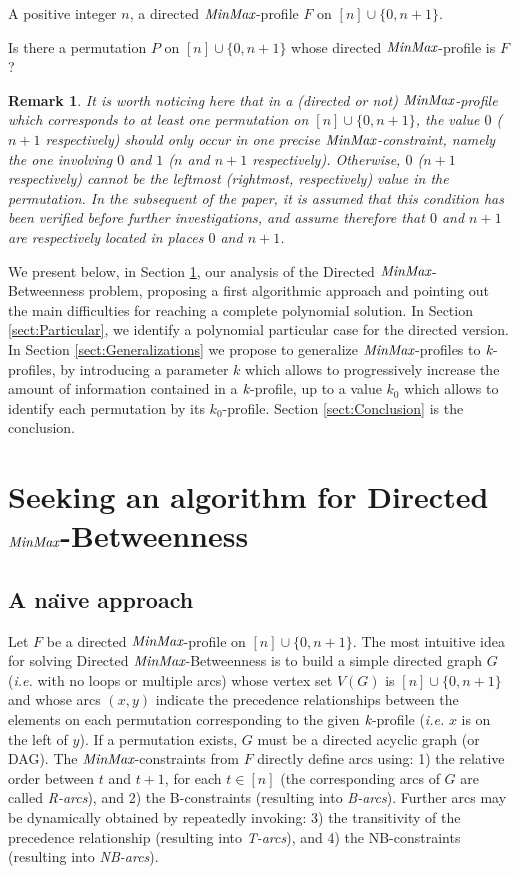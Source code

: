 \documentclass{article}
\newcommand{\M}{\mbox{\it MinMax}}
\newcommand{\kM}{\mbox{\it k}}
\newcommand{\n}{[n]}
\newtheorem{rmk}{Remark}
\newcommand{\br}{\begin{rmk}\rm}
\newcommand{\er}{\end{rmk}}
\begin{document}
\noindent{\sc Directed $\M$-Betweenness}

 A positive integer $n$, a directed $\M$-profile $F$ on $\n\cup\{0, n+1\}$.

 Is there a permutation $P$ on $\n\cup\{0,n+1\}$ whose directed $\M$-profile is $F$? 
\bigskip

\br
It is worth noticing here that in a (directed or not) $\M$-profile which corresponds to
at least one permutation on $\n\cup\{0,n+1\}$, the value $0$ ($n+1$ respectively) should
only occur in one precise $\M$-constraint, namely the one involving $0$ and $1$ ($n$ and
$n+1$ respectively). Otherwise, $0$ ($n+1$ respectively) cannot be the leftmost (rightmost, respectively)
value in the permutation. In the subsequent of the paper, it is assumed that this condition
has been verified before further investigations, and assume therefore that $0$ and $n+1$
are respectively located in places $0$ and $n+1$.
\label{rem:places0n+1}
\er

We present below, in Section \ref{sect:GeneralD}, our analysis of the Directed $\M$-{\sc Betweenness} problem,
proposing a first algorithmic approach and pointing out the main difficulties for reaching a complete polynomial solution. 
In Section \ref{sect:Particular}, we identify a polynomial particular case for the directed version. 
In Section \ref{sect:Generalizations} we propose to generalize $\M$-profiles to $\kM$-profiles, by introducing 
a parameter $k$ which allows to progressively increase the amount of information contained in a $\kM$-profile, 
up to a value $k_0$ which allows to identify each permutation by its $k_0$-profile. Section \ref{sect:Conclusion} is the
conclusion.

\section{Seeking an algorithm for {\sc Directed $\M$-Betweenness}}\label{sect:GeneralD}

\subsection{A na\"{\i}ve approach}

Let $F$ be a directed $\M$-profile on $\n\cup\{0,n+1\}$. The most intuitive idea for solving 
Directed $\M$-{\sc Betweenness} is  to build a simple
directed graph $G$ ({\em i.e.} with no loops or multiple arcs)
whose vertex set $V(G)$ is $\n\cup\{0,n+1\}$ and whose arcs $(x,y)$ indicate the precedence relationships
between the elements on each permutation corresponding to the given $\kM$-profile ({\em i.e.} $x$ is on the
left of $y$). If a permutation exists, $G$ must be a directed acyclic graph (or DAG). 
The $\M$-constraints from $F$ directly define arcs using: 1) the relative order between $t$ and $t+1$,  
for each $t\in \n$ (the corresponding arcs of $G$ are called {\em R-arcs}), 
and 2) the B-constraints (resulting into  {\em B-arcs}). Further arcs may be dynamically obtained by repeatedly invoking:  
3) the transitivity of the precedence relationship 
(resulting into {\em T-arcs}), and 4) the NB-constraints  (resulting into {\em NB-arcs}).  
\end{document}
